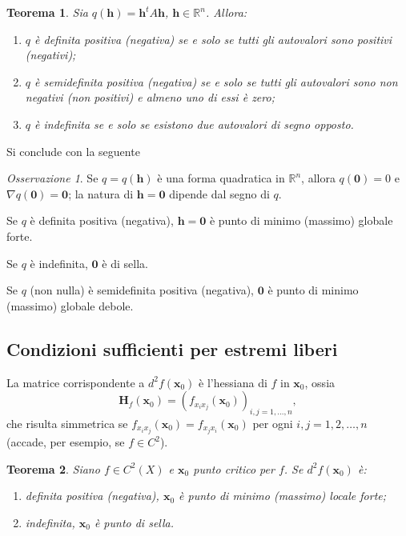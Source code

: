 \documentclass[a4paper]{book}
\numberwithin{equation}{section}
\theoremstyle{plain}
\newtheorem{teor}{Teorema}[section]
\theoremstyle{definition}
\theoremstyle{remark}
\newtheorem{oss}{Osservazione}[section]
\renewcommand{\vec}{\boldsymbol}
\theoremstyle{example}
\begin{document}
\begin{teor}
Sia $q(\vec{h}) = \vec{h}^tA\vec{h}$, $\vec{h} \in \mathbb{R}^n$. Allora:
	\begin{enumerate}
	\item $q$ è definita positiva (negativa) se e solo se tutti gli autovalori sono positivi (negativi);
	\item $q$ è semidefinita positiva (negativa) se e solo se tutti gli autovalori sono non negativi (non positivi) e almeno uno di essi è zero;
	\item $q$ è indefinita se e solo se esistono due autovalori di segno opposto.
	\end{enumerate}
\end{teor}

Si conclude con la seguente
\begin{oss}
Se $q = q(\vec{h})$ è una forma quadratica in $\mathbb{R}^n$, allora $q(\vec{0}) = 0$ e $\nabla q(\vec{0}) = \vec{0}$; la natura di $\vec{h} = \vec{0}$ dipende dal segno di $q$.

Se $q$ è definita positiva (negativa), $\vec{h} = \vec{0}$ è punto di minimo (massimo) globale forte.

Se $q$ è indefinita, $\vec{0}$ è di sella.

Se $q$ (non nulla) è semidefinita positiva (negativa), $\vec{0}$ è punto di minimo (massimo) globale debole.
\end{oss}

\subsection{Condizioni sufficienti per estremi liberi}
La matrice corrispondente a $d^2f(\vec{x}_0)$ è l'hessiana di $f$ in $\vec{x}_0$, ossia
	\begin{equation*}
	\mathbf{H}_f(\vec{x}_0) = (f_{x_ix_j}(\vec{x}_0))_{i,j = 1, \dots, n},
	\end{equation*}
che risulta simmetrica se $f_{x_ix_j}(\vec{x}_0) = f_{x_jx_i}(\vec{x}_0)$ per ogni $i,j = 1, 2, \dots, n$ (accade, per esempio, se $f \in C^2$).

\begin{teor}
Siano $f \in C^2(X)$ e $\vec{x}_0$ punto critico per $f$. Se $d^2f(\vec{x}_0)$ è:
	\begin{enumerate}
	\item definita positiva (negativa), $\vec{x}_0$ è punto di minimo (massimo) locale forte;
	\item indefinita, $\vec{x}_0$ è punto di sella.
	\end{enumerate}
\end{teor}
\end{document}
